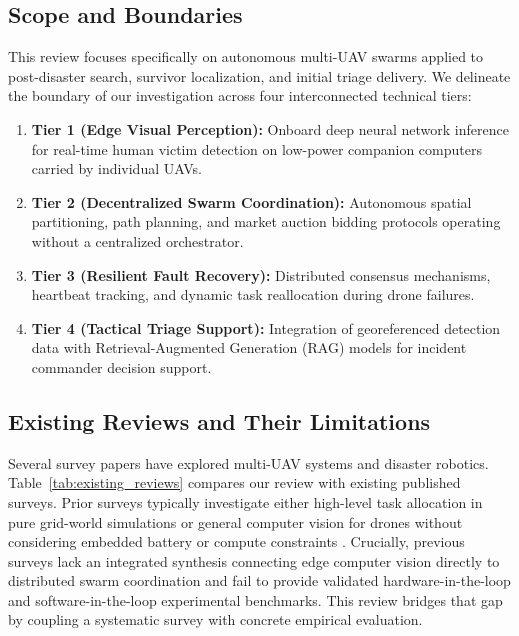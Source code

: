 \documentclass[journal]{IEEEtran}
\begin{document}
\subsection{Scope and Boundaries}
This review focuses specifically on autonomous multi-UAV swarms applied to post-disaster search, survivor localization, and initial triage delivery. We delineate the boundary of our investigation across four interconnected technical tiers:
\begin{enumerate}
    \item \textbf{Tier 1 (Edge Visual Perception):} Onboard deep neural network inference for real-time human victim detection on low-power companion computers carried by individual UAVs.
    \item \textbf{Tier 2 (Decentralized Swarm Coordination):} Autonomous spatial partitioning, path planning, and market auction bidding protocols operating without a centralized orchestrator.
    \item \textbf{Tier 3 (Resilient Fault Recovery):} Distributed consensus mechanisms, heartbeat tracking, and dynamic task reallocation during drone failures.
    \item \textbf{Tier 4 (Tactical Triage Support):} Integration of georeferenced detection data with Retrieval-Augmented Generation (RAG) models for incident commander decision support.
\end{enumerate}

\subsection{Existing Reviews and Their Limitations}
Several survey papers have explored multi-UAV systems and disaster robotics. Table~\ref{tab:existing_reviews} compares our review with existing published surveys. Prior surveys typically investigate either high-level task allocation in pure grid-world simulations \cite{2} or general computer vision for drones without considering embedded battery or compute constraints \cite{16}. Crucially, previous surveys lack an integrated synthesis connecting edge computer vision directly to distributed swarm coordination and fail to provide validated hardware-in-the-loop and software-in-the-loop experimental benchmarks. This review bridges that gap by coupling a systematic survey with concrete empirical evaluation.
\end{document}
